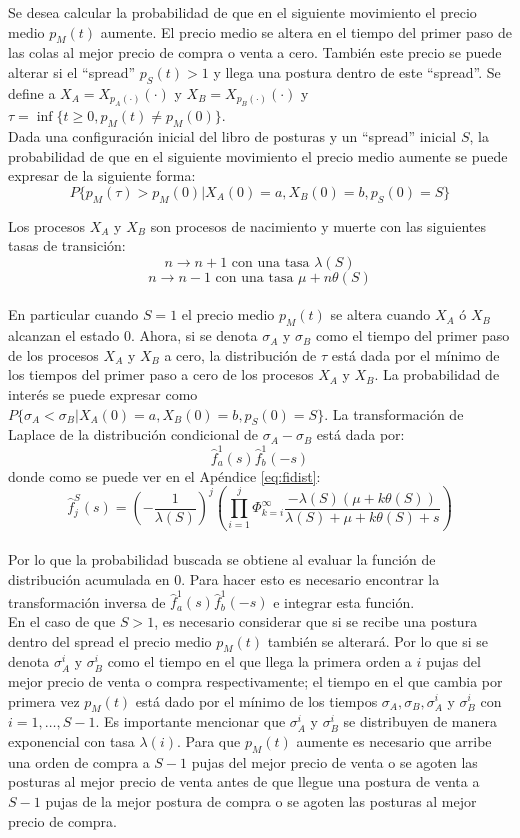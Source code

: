 \documentclass[11pt]{article}
\numberwithin{equation}{section} %
\begin{document}
Se desea calcular la probabilidad de que en el siguiente movimiento el precio medio $p_M(t)$ aumente. El precio medio se altera en el tiempo del primer paso de las colas al mejor precio de compra o venta a cero. También este precio se puede alterar si el ``spread'' $p_S(t)>1$ y llega una postura dentro de este ``spread''. Se define a $X_A=X_{p_A(\cdot)}(\cdot)$ y $X_B=X_{p_B(\cdot)}(\cdot)$ y $\tau=\inf\{t\geq 0, p_M(t) \neq p_M(0)\}$.\\

Dada una configuración inicial del libro de posturas y un ``spread'' inicial $S$, la probabilidad de que en el siguiente movimiento el precio medio aumente se puede expresar de la siguiente forma:
\[
P\{p_M(\tau)>p_M(0)|X_A(0)=a,X_B(0)=b,p_S(0)=S\}
\]

Los procesos $X_A$ y $X_B$ son procesos de nacimiento y muerte con las siguientes tasas de transición:
\[
n\rightarrow n+1 \text{ con una tasa }\lambda(S)
\]
\[
n\rightarrow n-1 \text{ con una tasa }\mu+n\theta(S)
\]\\

En particular cuando $S=1$ el precio medio $p_M(t)$ se altera cuando $X_A$ ó $X_B$ alcanzan el estado 0. Ahora, si se denota $\sigma_A$ y $\sigma_B$ como el tiempo del primer paso de los procesos $X_A$ y $X_B$ a cero, la distribución de $\tau$ está dada por el mínimo de los tiempos del primer paso a cero de los procesos $X_A$ y $X_B$. La probabilidad de interés se puede expresar como $P\{\sigma_A<\sigma_B|X_A(0)=a,X_B(0)=b,p_S(0)=S\}$. La transformación de Laplace de la distribución condicional de $\sigma_A-\sigma_B$ está dada por:
\[
\hat{f}_a^1(s)\hat{f}_b^1(-s)
\]
donde como se puede ver en el Apéndice \ref{eq:fidist}:
\[
\hat{f}_{j}^S(s)=\left(-\frac{1}{\lambda(S)}\right)^j\left( \prod_{i=1}^j \Phi_{k=i}^\infty \frac{-\lambda(S)(\mu+k\theta(S))}{\lambda(S)+\mu+k\theta(S)+s} \right)
\]\\

Por lo que la probabilidad buscada se obtiene al evaluar la función de distribución acumulada en 0. Para hacer esto es necesario encontrar la transformación inversa de $\hat{f}_a^1(s)\hat{f}_b^1(-s)$ e integrar esta función.\\

En el caso de que $S>1$, es necesario considerar que si se recibe una postura dentro del spread el precio medio $p_M(t)$ también se alterará. Por lo que si se denota $\sigma_A^i$ y $\sigma_B^i$ como el tiempo en el que llega la primera orden a $i$ pujas del mejor precio de venta o compra respectivamente; el tiempo en el que cambia por primera vez $p_M(t)$ está dado por el mínimo de los tiempos $\sigma_A,\sigma_B,\sigma_A^i$ y $\sigma_B^i$ con $i=1,\ldots,S-1$. Es importante mencionar que $\sigma_A^i$ y $\sigma_B^i$ se distribuyen de manera exponencial con tasa $\lambda(i)$. Para que $p_M(t)$ aumente es necesario que arribe una orden de compra a $S-1$ pujas del mejor precio de venta o se agoten las posturas al mejor precio de venta antes de que llegue una postura de venta a $S-1$ pujas de la mejor postura de compra o se agoten las posturas al mejor precio de compra.\\
\end{document}
